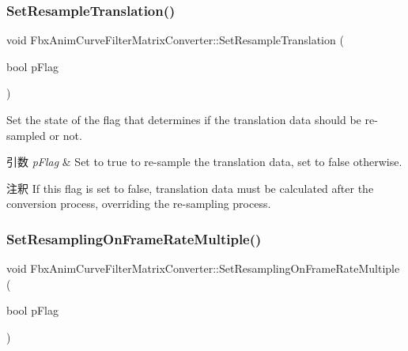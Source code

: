 \subsubsection{\texorpdfstring{Set\+Resample\+Translation()}{SetResampleTranslation()}}
{\footnotesize\ttfamily void Fbx\+Anim\+Curve\+Filter\+Matrix\+Converter\+::\+Set\+Resample\+Translation (\begin{DoxyParamCaption}\item[{bool}]{p\+Flag }\end{DoxyParamCaption})}

Set the state of the flag that determines if the translation data should be re-\/sampled or not. 
\begin{DoxyParams}{引数}
{\em p\+Flag} & Set to {\ttfamily true} to re-\/sample the translation data, set to {\ttfamily false} otherwise. \\
\hline
\end{DoxyParams}
\begin{DoxyRemark}{注釈}
If this flag is set to {\ttfamily false}, translation data must be calculated after the conversion process, overriding the re-\/sampling process. 
\end{DoxyRemark}
\mbox{\label{class_fbx_anim_curve_filter_matrix_converter_a7b23dfad34cae6de4c7f20ea8c071633}} 
\subsubsection{\texorpdfstring{Set\+Resampling\+On\+Frame\+Rate\+Multiple()}{SetResamplingOnFrameRateMultiple()}}
{\footnotesize\ttfamily void Fbx\+Anim\+Curve\+Filter\+Matrix\+Converter\+::\+Set\+Resampling\+On\+Frame\+Rate\+Multiple (\begin{DoxyParamCaption}\item[{bool}]{p\+Flag }\end{DoxyParamCaption})}

